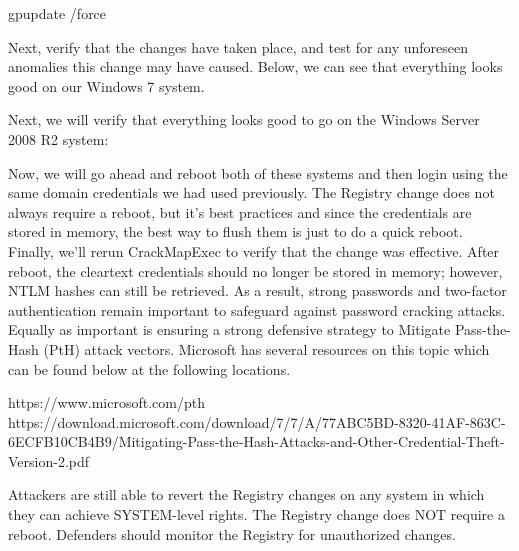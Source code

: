 gpupdate /force

Next, verify that the changes have taken place, and test for any unforeseen anomalies this change may have caused.
Below, we can see that everything looks good on our Windows 7 system.

Next, we will verify that everything looks good to go on the Windows Server 2008 R2 system:

Now, we will go ahead and reboot both of these systems and then login using the same domain credentials we had used previously. The Registry change does not always require a reboot, but it's best practices and since the credentials are stored in memory, the best way to flush them is just to do a quick reboot.
Finally, we'll rerun CrackMapExec to verify that the change was effective. After reboot, the cleartext credentials should no longer be stored in memory; however, NTLM hashes can still be retrieved. As a result, strong passwords and two-factor authentication remain important to safeguard against password cracking attacks. Equally as important is ensuring a strong defensive strategy to Mitigate Pass-the-Hash (PtH) attack vectors. Microsoft has several resources on this topic which can be found below at the following locations.

https://www.microsoft.com/pth
https://download.microsoft.com/download/7/7/A/77ABC5BD-8320-41AF-863C-6ECFB10CB4B9/Mitigating-Pass-the-Hash-Attacks-and-Other-Credential-Theft-Version-2.pdf

Attackers are still able to revert the Registry changes on any system in which they can achieve SYSTEM-level rights. The Registry change does NOT require a reboot. Defenders should monitor the Registry for unauthorized changes.